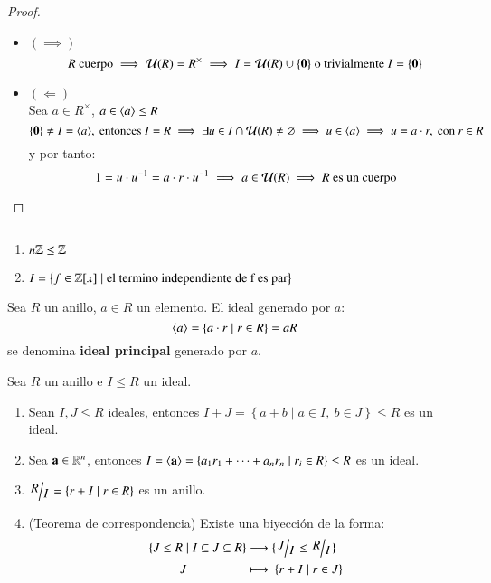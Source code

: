 \begin{proof}$ $
    \begin{itemize}
        \item $\left( \implies \right)$
        $$
            R \text{ cuerpo} \implies \mathcal{U}(R) = R^{\times} \implies I = \mathcal{U}(R) \cup \{\mathbf{0}\} \text{ o trivialmente } I = \{\mathbf{0}\}
        $$
        \item $\left( \Longleftarrow \right)$\\
        Sea $a \in R^{\times}$, $a \in \langle a\rangle \leq R$
        $$
            \{\mathbf{0}\} \neq I = \langle a\rangle,\text{ entonces } I = R \implies \exists u \in I \cap \mathcal{U}(R) \neq \varnothing \implies u \in \langle a\rangle \implies u = a\cdot r, \text{ con } r \in R
        $$
        y por tanto:
        $$
            1 = u \cdot u^{-1} = a \cdot r \cdot u^{-1} \implies a \in \mathcal{U}(R) \implies R \text{ es un cuerpo}
        $$
    \end{itemize}
\end{proof}

\begin{eg}$ $
    \begin{enumerate}
        \item $n\mathbb{Z} \leq \mathbb{Z}$
        \item $I = \left\{ f \in \mathbb{Z}[x] \mid \text{el termino independiente de f es par} \right\}$
    \end{enumerate}
\end{eg}

\begin{dfn}
    Sea $R$ un anillo, $a \in R$ un elemento. El ideal generado por $a$:
    $$
        \langle a\rangle = \left\{a\cdot r \mid r \in R\right\} = aR
    $$
    se denomina \textbf{ideal principal} generado por $a$.
\end{dfn}

\begin{pro} Sea $ R $ un anillo e $ I \leq R $ un ideal.
    \begin{enumerate}
        \item Sean $I, J \leq R$ ideales, entonces $I+J = \left\{a+b \mid a \in I,\ b \in J\right\} \leq R$ es un ideal.
        \item Sea $\mathbf{a} \in \mathbb{R}^n$, entonces $I = \langle\mathbf{a}\rangle = \left\{ a_1r_1 + \cdots + a_nr_n \mid r_i \in R \right\} \leq R$ es un ideal.
        \item $\quo{R}{I} = \left\{r + I \mid r \in R\right\}$ es un anillo.
        \item \label{pro:correspondencia}(Teorema de correspondencia) Existe una biyección de la forma:
        \begin{align*}
            \{J \leq R \mid I \subseteq J \subseteq R\} &\longrightarrow \{\quo{J}{I} \leq \quo{R}{I}\}\\
             J \appad{80mu} &\longmapsto \appad{4mu} \{r + I \mid r \in J\}
        \end{align*}
    \end{enumerate}
\end{pro}

